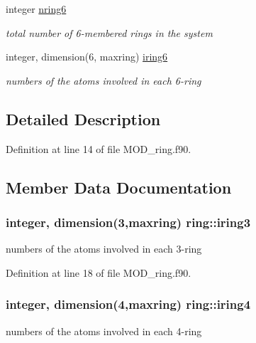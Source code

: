 \begin{DoxyCompactItemize}
integer \hyperlink{classring_a54b1461c8d62894bf1c2cdf1aa138457}{nring6}
\begin{DoxyCompactList}\small\item\em total number of 6-\/membered rings in the system \end{DoxyCompactList}\item 
integer, dimension(6, maxring) \hyperlink{classring_a1219a998acdcec6146da29df5c2c11e3}{iring6}
\begin{DoxyCompactList}\small\item\em numbers of the atoms involved in each 6-\/ring \end{DoxyCompactList}\end{DoxyCompactItemize}


\subsection{Detailed Description}


Definition at line 14 of file M\-O\-D\-\_\-ring.\-f90.



\subsection{Member Data Documentation}
\hypertarget{classring_a3bc564cc968daf49c6dad75eebd480c8}{
\subsubsection[{iring3}]{\setlength{\rightskip}{0pt plus 5cm}integer, dimension(3,maxring) ring\-::iring3}}\label{classring_a3bc564cc968daf49c6dad75eebd480c8}


numbers of the atoms involved in each 3-\/ring 



Definition at line 18 of file M\-O\-D\-\_\-ring.\-f90.

\hypertarget{classring_ac49f3aa846c6203d5da4f56249225200}{
\subsubsection[{iring4}]{\setlength{\rightskip}{0pt plus 5cm}integer, dimension(4,maxring) ring\-::iring4}}\label{classring_ac49f3aa846c6203d5da4f56249225200}


numbers of the atoms involved in each 4-\/ring 



